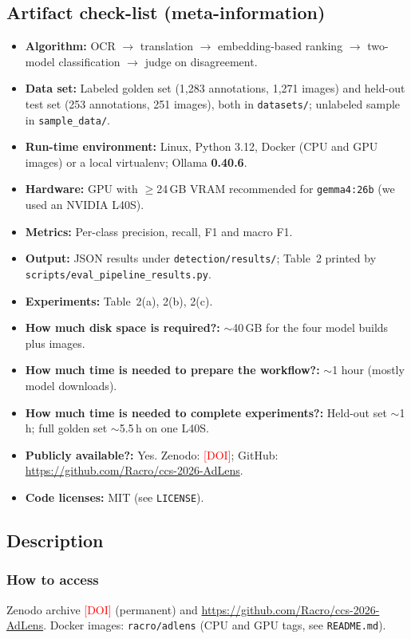 \documentclass[sigconf,nonacm]{acmart}
\newcommand{\todo}[1]{\textcolor{red}{[#1]}}
\begin{document}
\subsection{Artifact check-list (meta-information)}
{\small
\begin{itemize}
  \item \textbf{Algorithm:} OCR $\rightarrow$ translation $\rightarrow$ embedding-based ranking $\rightarrow$ two-model classification $\rightarrow$ judge on disagreement.
  \item \textbf{Data set:} Labeled golden set (1{,}283 annotations, 1{,}271 images) and held-out test set (253 annotations, 251 images), both in \texttt{datasets/}; unlabeled sample in \texttt{sample\_data/}.
  \item \textbf{Run-time environment:} Linux, Python 3.12, Docker (CPU and GPU images) or a local virtualenv; Ollama \textbf{0.40.6}.
  \item \textbf{Hardware:} GPU with $\geq$24\,GB VRAM recommended for \texttt{gemma4:26b} (we used an NVIDIA L40S).
  \item \textbf{Metrics:} Per-class precision, recall, F1 and macro F1.
  \item \textbf{Output:} JSON results under \texttt{detection/results/}; Table~2 printed by \texttt{scripts/eval\_pipeline\_results.py}.
  \item \textbf{Experiments:} Table~2(a), 2(b), 2(c).
  \item \textbf{How much disk space is required?:} $\sim$40\,GB for the four model builds plus images.
  \item \textbf{How much time is needed to prepare the workflow?:} $\sim$1 hour (mostly model downloads).
  \item \textbf{How much time is needed to complete experiments?:} Held-out set $\sim$1\,h; full golden set $\sim$5.5\,h on one L40S.
  \item \textbf{Publicly available?:} Yes. Zenodo: \todo{DOI}; GitHub: \url{https://github.com/Racro/ccs-2026-AdLens}.
  \item \textbf{Code licenses:} MIT (see \texttt{LICENSE}).
\end{itemize}}

\subsection{Description}

\subsubsection{How to access}
Zenodo archive \todo{DOI} (permanent) and \url{https://github.com/Racro/ccs-2026-AdLens}. Docker images: \texttt{racro/adlens} (CPU and GPU tags, see \texttt{README.md}).
\end{document}
